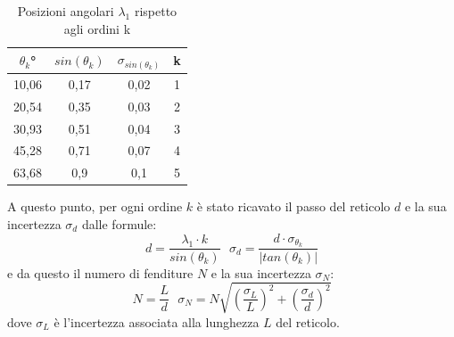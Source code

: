 \documentclass{article}
\begin{document}
        \begin{table}[H]

            \centering

            \begin{tabular}{c c c c}

                \toprule 
                $\theta_k$° & $sin(\theta_k)$ & $\sigma_{sin(\theta_k)}$ & k \\
                
                \midrule
                10,06	&	0,17	&	0,02	&	1\\
                20,54	&	0,35	&	0,03	&	2\\
                30,93	&	0,51	&	0,04	&	3\\
                45,28	&	0,71	&	0,07	&	4\\
                63,68	&	0,9	    &	0,1	    &	5\\
                \bottomrule
            
            \end{tabular}
            
            \caption{Posizioni angolari $\lambda_1$ rispetto agli ordini k}
            \label{tabular:posizioni angolari sodio}

        \end{table}

        A questo punto, per ogni ordine $k$ è stato ricavato il passo del reticolo $d$ e la sua incertezza $\sigma_d$ dalle formule: 
        \[d = \frac{\lambda_1 \cdot k}{sin(\theta_k)} \ \ \ \sigma_d = \frac{d \cdot \sigma_{\theta_k}}{|tan(\theta_k)|}\]
        e da questo il numero di fenditure $N$ e la sua incertezza $\sigma_N$: 
        \[N = \frac{L}{d} \ \ \ \sigma_N = N \sqrt{(\frac{\sigma_L}{L})^2 + (\frac{\sigma_d}{d})^2}\]
        dove $\sigma_L$ è l'incertezza associata alla lunghezza $L$ del reticolo. \\
        
\end{document}
